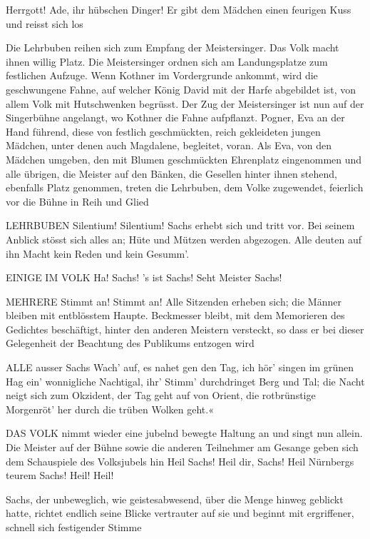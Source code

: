 \begin{drama}
\Davidspeaks
Herrgott! Ade, ihr hübschen Dinger!
Er gibt dem Mädchen einen feurigen Kuss und reisst sich los

Die Lehrbuben reihen sich zum Empfang der Meistersinger. Das Volk macht ihnen willig Platz. Die Meistersinger ordnen sich am Landungsplatze zum festlichen Aufzuge. Wenn Kothner im Vordergrunde ankommt, wird die geschwungene Fahne, auf welcher König David mit der Harfe abgebildet ist, von allem Volk mit Hutschwenken begrüsst. Der Zug der Meistersinger ist nun auf der Singerbühne angelangt, wo Kothner die Fahne aufpflanzt. Pogner, Eva an der Hand führend, diese von festlich geschmückten, reich gekleideten jungen Mädchen, unter denen auch Magdalene, begleitet, voran. Als Eva, von den Mädchen umgeben, den mit Blumen geschmückten Ehrenplatz eingenommen und alle übrigen, die Meister auf den Bänken, die Gesellen hinter ihnen stehend, ebenfalls Platz genommen, treten die Lehrbuben, dem Volke zugewendet, feierlich vor die Bühne in Reih und Glied

LEHRBUBEN
Silentium! Silentium!
Sachs erhebt sich und tritt vor. Bei seinem Anblick stösst sich alles an; Hüte und Mützen werden abgezogen. Alle deuten auf ihn
Macht kein Reden und kein Gesumm'.

EINIGE IM VOLK
Ha! Sachs! 's ist Sachs!
Seht Meister Sachs!

MEHRERE
Stimmt an! Stimmt an!
Alle Sitzenden erheben sich; die Männer bleiben mit entblösstem Haupte. Beckmesser bleibt, mit dem Memorieren des Gedichtes beschäftigt, hinter den anderen Meistern versteckt, so dass er bei dieser Gelegenheit der Beachtung des Publikums entzogen wird

ALLE
ausser Sachs
Wach' auf, es nahet gen den Tag,
ich hör' singen im grünen Hag
ein' wonnigliche Nachtigal,
ihr' Stimm' durchdringet Berg und Tal;
die Nacht neigt sich zum Okzident,
der Tag geht auf von Orient,
die rotbrünstige Morgenröt'
her durch die trüben Wolken geht.«

DAS VOLK
nimmt wieder eine jubelnd bewegte Haltung an und singt nun allein. Die Meister auf der Bühne sowie die anderen Teilnehmer am Gesange geben sich dem Schauspiele des Volksjubels hin
Heil Sachs! Heil dir, Sachs!
Heil Nürnbergs teurem Sachs! Heil! Heil!

Sachs, der unbeweglich, wie geistesabwesend, über die Menge hinweg geblickt hatte, richtet endlich seine Blicke vertrauter auf sie und beginnt mit ergriffener, schnell sich festigender Stimme


\end{drama}

